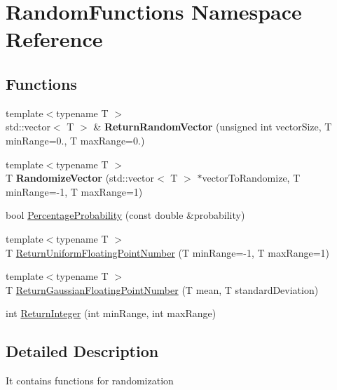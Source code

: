 \hypertarget{namespace_random_functions}{\section{Random\-Functions Namespace Reference}
\label{namespace_random_functions}
}
\subsection*{Functions}
\begin{DoxyCompactItemize}
\item 
\hypertarget{namespace_random_functions_a350dce82bad1dcf14eda5f13fd8a71b0}{{\footnotesize template$<$typename T $>$ }\\std\-::vector$<$ T $>$ \& {\bfseries Return\-Random\-Vector} (unsigned int vector\-Size, T min\-Range=0., T max\-Range=0.)}\label{namespace_random_functions_a350dce82bad1dcf14eda5f13fd8a71b0}

\item 
\hypertarget{namespace_random_functions_a9dadfe32d54cb115dbcff0947c14636c}{{\footnotesize template$<$typename T $>$ }\\T {\bfseries Randomize\-Vector} (std\-::vector$<$ T $>$ $\ast$vector\-To\-Randomize, T min\-Range=-\/1, T max\-Range=1)}\label{namespace_random_functions_a9dadfe32d54cb115dbcff0947c14636c}

\item 
bool \hyperlink{namespace_random_functions_ae21250aea3088912780a1076997705a4}{Percentage\-Probability} (const double \&probability)
\item 
{\footnotesize template$<$typename T $>$ }\\T \hyperlink{namespace_random_functions_ac55cefe4f588e01fc03ae38654392603}{Return\-Uniform\-Floating\-Point\-Number} (T min\-Range=-\/1, T max\-Range=1)
\item 
{\footnotesize template$<$typename T $>$ }\\T \hyperlink{namespace_random_functions_a55ad7cfd900e46d68eae56a0423ecc7e}{Return\-Gaussian\-Floating\-Point\-Number} (T mean, T standard\-Deviation)
\item 
int \hyperlink{namespace_random_functions_a200a639a00e395a6d053a689a558227f}{Return\-Integer} (int min\-Range, int max\-Range)
\end{DoxyCompactItemize}


\subsection{Detailed Description}
It contains functions for randomization 

